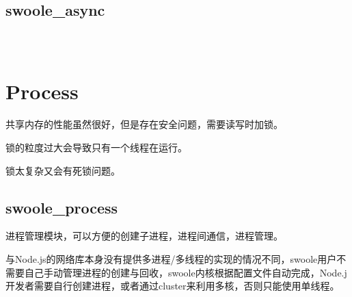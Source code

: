 \section{swoole\_async}



\begin{lstlisting}[language=bash]

\end{lstlisting}




\begin{lstlisting}[language=bash]

\end{lstlisting}




\begin{lstlisting}[language=bash]

\end{lstlisting}


\chapter{Process}


共享内存的性能虽然很好，但是存在安全问题，需要读写时加锁。

\begin{compactitem}
\item 锁的粒度过大会导致只有一个线程在运行。
\item 锁太复杂又会有死锁问题。
\end{compactitem}



\section{swoole\_process}

进程管理模块，可以方便的创建子进程，进程间通信，进程管理。

与Node.js的网络库本身没有提供多进程/多线程的实现的情况不同，swoole用户不需要自己手动管理进程的创建与回收，swoole内核根据配置文件自动完成，Node.j开发者需要自行创建进程，或者通过cluster来利用多核，否则只能使用单线程。






\begin{lstlisting}[language=bash]

\end{lstlisting}




\begin{lstlisting}[language=bash]

\end{lstlisting}




